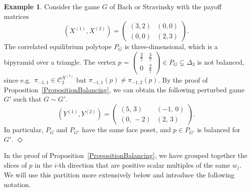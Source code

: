 \documentclass[11pt]{amsart}
\theoremstyle{definition}
\newtheorem{example}[theorem]{Example}
\numberwithin{subcase}{case}
\newcommand*{\QEDA}{\hfill\ensuremath{\Diamond}}
\begin{document}
\begin{example}
    Consider the game $G$ of Bach or Stravinsky with the payoff matrices \[
(X^{(1)},X^{(2)})=
\begin{pmatrix}
(3,2) & (0,0) \\
(0,0) & (2,3)
\end{pmatrix}.
\]
The correlated equilibrium polytope $P_G$ is three-dimensional, which is a bipyramid over a triangle. The vertex $p$ =  $\begin{pmatrix}
\frac{2}{7} & \frac{3}{7} \\
0 & \frac{2}{7} 
\end{pmatrix} \in  P_G \subsetneq \Delta_3$ is not balanced, since e.g.\ $\pi_{-1,1} \in \mathcal{C}_2^{X^{(1)}}$ but $\pi_{-1,1}(p) \neq \pi_{-1,2}(p)$. By the proof of Proposition~\ref{PropositionBalancing}, we can obtain the following perturbed game $G'$ such that $G \sim G'$.
\[
(Y^{(1)},Y^{(2)})=
\begin{pmatrix}
\left(5,\,3\right)
&
\left(-1,\,0\right)
\\
\left(0,\,-{2}\right)
&
\left(2,\,3\right)
\end{pmatrix}.
\]
In particular, $P_G$ and $P_{G'}$ have the same face poset, and $p \in P_{G'}$ is balanced for $G'$.
\QEDA
\end{example}

\noindent In the proof of Proposition~\ref{PropositionBalancing}, we have grouped together the slices of $p$ in
the $i$-th direction that are positive scalar multiples of the same
$w_j$. We will use this partition more extensively below and introduce
the following notation.
\end{document}
